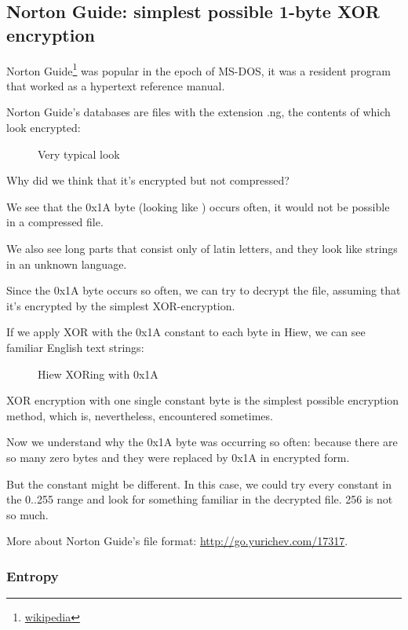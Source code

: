 \clearpage
\subsection{Norton Guide: simplest possible 1-byte XOR encryption}
\label{norton_guide}

Norton Guide\footnote{\href{http://go.yurichev.com/17116}{wikipedia}} was popular in the epoch of MS-DOS, it was a resident program that worked as a hypertext reference manual.

Norton Guide's databases are files with the extension .ng, the contents of which look encrypted:

\begin{figure}[H]
\centering
{}
\caption{Very typical look}
\end{figure}

Why did we think that it's encrypted but not compressed?

We see that the 0x1A byte (looking like \q{$\rightarrow$}) occurs often, it would not be possible in a compressed file.

We also see long parts that consist only of latin letters, and they look like strings in an unknown
language.

\clearpage
Since the 0x1A byte occurs so often, we can try to decrypt the file, assuming that it's encrypted
by the simplest XOR-encryption.

If we apply XOR with the 0x1A constant to each byte in Hiew, we can see familiar English text strings:

\begin{figure}[H]
\centering
{}
\caption{Hiew XORing with 0x1A}
\end{figure}

XOR encryption with one single constant byte is the simplest possible encryption method, which is, nevertheless,
encountered sometimes.

Now we understand why the 0x1A byte was occurring so often: because there are so many zero bytes and they
were replaced by 0x1A in encrypted form.

But the constant might be different.
In this case, we could try every constant in the 0..255 range and look for something familiar in the decrypted
file. 256 is not so much.

More about Norton Guide's file format: \url{http://go.yurichev.com/17317}.

\subsubsection{Entropy}

